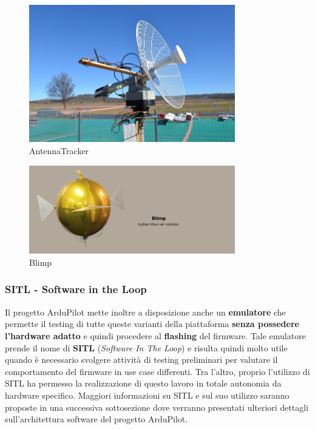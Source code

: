 \documentclass[a4paper, 12pt, oneside]{article}
\begin{document}
\begin{figure}[H]
    \centering
    \includegraphics[width=0.8\textwidth]{images/antenna.jpg}
    \caption{AntennaTracker}
\end{figure}
\begin{figure}[H]
    \centering
    \includegraphics[width=0.8\textwidth]{images/blimp.png}
    \caption{Blimp}
\end{figure}

\newpage

\subsubsection{SITL - Software in the Loop}
Il progetto ArduPilot mette inoltre a disposizione anche un \textbf{emulatore} che permette il testing di tutte queste varianti della piattaforma \textbf{senza possedere l'hardware adatto} \cite{sitl} e quindi procedere al \textbf{flashing} del firmware. Tale emulatore prende il nome di \textbf{SITL} (\textit{Software In The Loop}) e risulta quindi molto utile quando è necessario svolgere attività di testing preliminari per valutare il comportamento del firmware in use case differenti. Tra l'altro, proprio l'utilizzo di SITL ha permesso la realizzazione di questo lavoro in totale autonomia da hardware specifico. Maggiori informazioni su SITL e sul suo utilizzo saranno proposte in una successiva sottosezione dove verranno presentati ulteriori dettagli sull'architettura software del progetto ArduPilot.
\end{document}
